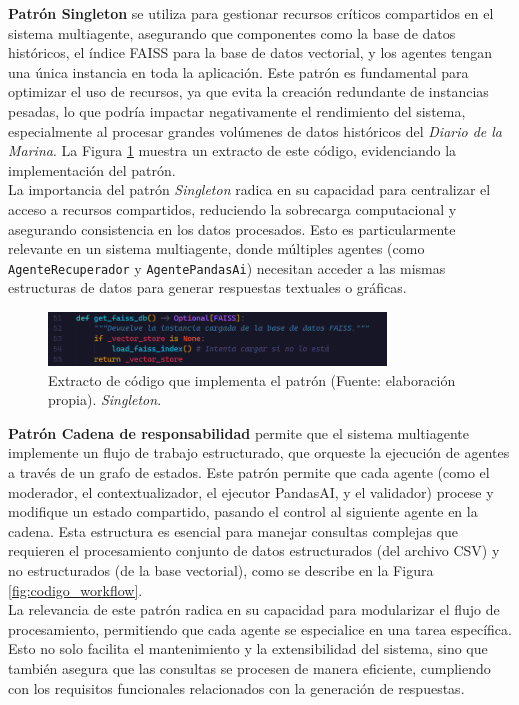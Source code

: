 \textbf{Patrón Singleton} se utiliza para gestionar recursos críticos compartidos en el sistema multiagente, asegurando que componentes como la base de datos históricos, el índice FAISS para la base de datos vectorial, y los agentes tengan una única instancia en toda la aplicación. Este patrón es fundamental para optimizar el uso de recursos, ya que evita la creación redundante de instancias pesadas, lo que podría impactar negativamente el rendimiento del sistema, especialmente al procesar grandes volúmenes de datos históricos del \textit{Diario de la Marina}. La Figura \ref{fig:codigo_singleton} muestra un extracto de este código, evidenciando la implementación del patrón.\\
La importancia del patrón \textit{Singleton} radica en su capacidad para centralizar el acceso a recursos compartidos, reduciendo la sobrecarga computacional y asegurando consistencia en los datos procesados. Esto es particularmente relevante en un sistema multiagente, donde múltiples agentes (como \texttt{AgenteRecuperador} y \texttt{AgentePandasAi}) necesitan acceder a las mismas estructuras de datos para generar respuestas textuales o gráficas.

\begin{figure}[htbp]
	\centering
	\includegraphics[width=0.8\textwidth]{images/singleton.PNG}
	\caption{Extracto de código que implementa el patrón (Fuente: elaboración propia). \textit{Singleton}.}
	\label{fig:codigo_singleton}
\end{figure}

\textbf{Patrón Cadena de responsabilidad} permite que el sistema multiagente implemente un flujo de trabajo estructurado, que orqueste la ejecución de agentes a través de un grafo de estados. Este patrón permite que cada agente (como el moderador, el contextualizador, el ejecutor PandasAI, y el validador) procese y modifique un estado compartido, pasando el control al siguiente agente en la cadena. Esta estructura es esencial para manejar consultas complejas que requieren el procesamiento conjunto de datos estructurados (del archivo CSV) y no estructurados (de la base vectorial), como se describe en la Figura \ref{fig:codigo_workflow}.\\ 
La relevancia de este patrón radica en su capacidad para modularizar el flujo de procesamiento, permitiendo que cada agente se especialice en una tarea específica. Esto no solo facilita el mantenimiento y la extensibilidad del sistema, sino que también asegura que las consultas se procesen de manera eficiente, cumpliendo con los requisitos funcionales relacionados con la generación de respuestas.

